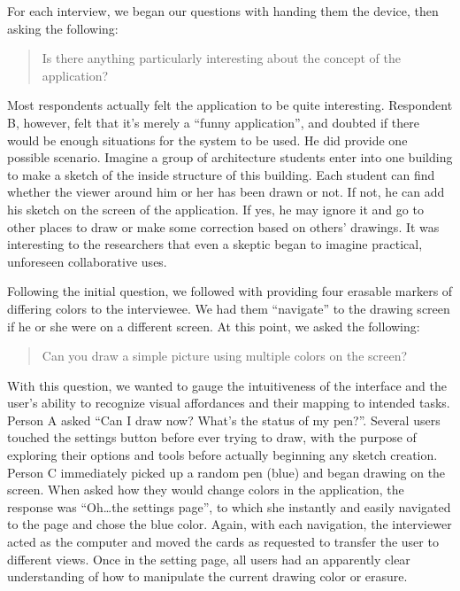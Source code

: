\documentclass{chi2009}
\begin{document}
For each interview, we began our questions with handing them the device, then
asking the following:
\begin{quote}
Is there anything particularly interesting about the concept of the
application?
\end{quote}

Most respondents actually felt the application to be quite interesting.
Respondent B, however, felt that it's merely a ``funny application'', and doubted if
there would be enough situations for the system to be used.   He did provide
one possible  scenario. Imagine a group of architecture students
enter into one building to make a sketch of the inside structure of this
building. Each student can find whether the viewer around him or her has been
drawn or not. If not, he can add his sketch on the screen of the application.
If yes, he may ignore it and go to other places to draw or make some correction
based on others' drawings.  It was interesting to the researchers that even a
skeptic began to imagine practical, unforeseen collaborative uses.

Following the initial question, we followed with providing four erasable
markers of differing colors to the interviewee.  We had them ``navigate'' to
the drawing screen if he or she were on a different screen.  At this point, we
asked the following:

\begin{quote}
Can you draw a simple picture using multiple colors on the screen?
\end{quote}

With this question, we wanted to gauge the intuitiveness of the interface and
the user's ability to recognize visual affordances and their mapping to
intended tasks.  Person A asked ``Can I draw now?  What's the status of my
pen?''.  Several users touched the settings button before ever trying to draw,
with the purpose of exploring their options and tools before actually beginning
any sketch creation.  Person C immediately picked up a random pen (blue) and
began drawing on the screen.  When asked how they would change colors in the
application, the response was ``Oh\ldots  the settings page'', to which she
instantly and easily navigated to the page and chose the blue color.  Again,
with each navigation, the interviewer acted as the computer and moved the cards
as requested to transfer the user to different views.  Once in the setting
page, all users had an apparently clear understanding of how to manipulate the
current drawing color or erasure.
\end{document}
